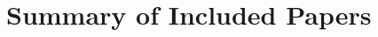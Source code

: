 
\chapter{Summary of Included Papers}
\label{chap:summary_of_included_papers}

\noindent 


\begingroup
\renewcommand\thesection{\Alph{section}} %





\endgroup
